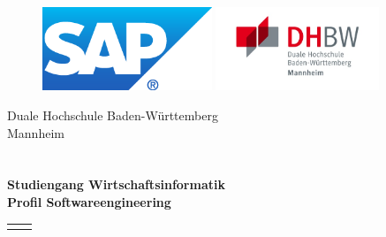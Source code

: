 \documentclass[12pt,a4paper]{scrreprt}
\newif\ifsperr
\newif\ifroman
\begin{document}
	\ifroman
		\pagenumbering{Roman}
	\fi
	\hypertarget{top}{}
	\bookmark[dest=top]{\Titel}
	\thispagestyle{empty}
	\begin{figure}[htbp]
		\begin{minipage}[!t]{4cm}
			\includegraphics[height=2.5cm, natwidth=300, natheight=148]{img/SAPlogo.png}
		\end{minipage}
		\hfill
		\begin{minipage}[!t]{5cm}
			\includegraphics [height=2.5cm, natwidth=553, natheight=282] {img/dhbw.png}
		\end{minipage}
	\end{figure}
	\begin{center}
		\large{Duale Hochschule Baden-Württemberg}\\
		\large{Mannheim}\\
		\Large{\Arbeitstyp}\\
		\vspace{20px}
		\textbf{\Large{\Titel}}\\
		\vspace{20px}
		\normalsize
		\textbf{Studiengang Wirtschaftsinformatik}\\
		\textbf{\small{Profil Softwareengineering}}\\
		\ifsperr
			\textcolor{red}{\textbf{-Sperrvermerk-}}\\
		\fi
	\end{center}
	\renewcommand{\arraystretch}{1.4}
	\begin{table}[!b]
		\begin{tabular}{ll}
			\Titelblatt{}
		\end{tabular}
	\end{table}
	\renewcommand{\arraystretch}{1}
	
	\ifsperr
		\newpage
		\hypertarget{nda}{}
\end{document}

